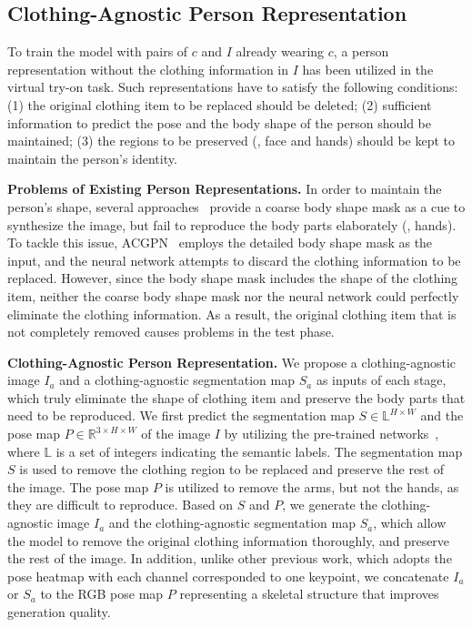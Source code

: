 \subsection{Clothing-Agnostic Person Representation}\label{sec:person representation}
To train the model with pairs of $c$ and $I$ already wearing $c$, a person representation without the clothing information in $I$ has been utilized in the virtual try-on task.
Such representations have to satisfy the following conditions:
(1) the original clothing item to be replaced should be deleted;
(2) sufficient information to predict the pose and the body shape of the person should be maintained;
(3) the regions to be preserved (\eg, face and hands) should be kept to maintain the person's identity.

\textbf{Problems of Existing Person Representations.}
In order to maintain the person's shape, several approaches~\cite{han2018viton, wang2018toward, yu2019vtnfp} provide a coarse body shape mask as a cue to synthesize the image, but fail to reproduce the body parts elaborately (\eg, hands).
To tackle this issue, ACGPN~\cite{yang2020towards} employs the detailed body shape mask as the input, and the neural network attempts to discard the clothing information to be replaced.
However, since the body shape mask includes the shape of the clothing item, neither the coarse body shape mask nor the neural network could perfectly eliminate the clothing information.
As a result, the original clothing item that is not completely removed causes problems in the test phase.

\textbf{Clothing-Agnostic Person Representation.}
We propose a clothing-agnostic image $I_a$ and a clothing-agnostic segmentation map $S_a$ as inputs of each stage, which truly eliminate the shape of clothing item and preserve the body parts that need to be reproduced.
We first predict the segmentation map $S \in \mathbb{L}^{H \times W}$ and the pose map $P \in \mathbb{R}^{3 \times H \times W}$ of the image $I$ by utilizing the pre-trained networks~\cite{gong2018instance, cao2019openpose}, where $\mathbb{L}$ is a set of integers indicating the semantic labels.
The segmentation map $S$ is used to remove the clothing region to be replaced and preserve the rest of the image.
The pose map $P$ is utilized to remove the arms, but not the hands, as they are difficult to reproduce.
Based on $S$ and $P$, we generate the clothing-agnostic image $I_a$ and the clothing-agnostic segmentation map $S_a$, which allow the model to remove the original clothing information thoroughly, and preserve the rest of the image.
In addition, unlike other previous work, which adopts the pose heatmap with each channel corresponded to one keypoint, we concatenate $I_a$ or $S_a$ to the RGB pose map $P$ representing a skeletal structure that improves generation quality.

